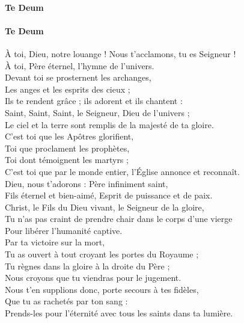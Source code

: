 \documentclass[twoside]{article}
\begin{document}
\begin{paracol}[1]{2}
\paragraph{Te Deum}
	
\newpage

\switchcolumn

\paragraph{Te Deum}

À toi, Dieu, notre louange ! Nous t’acclamons, tu es Seigneur !\\
À toi, Père éternel, l’hymne de l’univers.\\
Devant toi se prosternent les archanges, \\
Les anges et les esprits des cieux ;\\
Ils te rendent grâce ; ils adorent et ils chantent :\\
Saint, Saint, Saint, le Seigneur, Dieu de l’univers ;\\
Le ciel et la terre sont remplis de la majesté de ta gloire.\\
C’est toi que les Apôtres glorifient,\\
Toi que proclament les prophètes,\\
Toi dont témoignent les martyrs ;\\
\newpage
C’est toi que par le monde entier, l’Église annonce et reconnaît.\\
Dieu, nous t’adorons : Père infiniment saint,\\
Fils éternel et bien-aimé, Esprit de puissance et de paix.\\
Christ, le Fils du Dieu vivant, le Seigneur de la gloire,\\
Tu n’as pas craint de prendre chair dans le corps d’une vierge\\
Pour libérer l’humanité captive.\\
Par ta victoire sur la mort, \\
Tu as ouvert à tout croyant les portes du Royaume ;\\
Tu règnes dans la gloire à la droite du Père ;\\
Nous croyons que tu viendras pour le jugement.\\
Nous t'en supplions donc, porte secours à tes fidèles,\\
Que tu as rachetés par ton sang :\\
Prends-les pour l'éternité avec tous les saints dans ta lumière.\\

\end{paracol}
\end{document}
